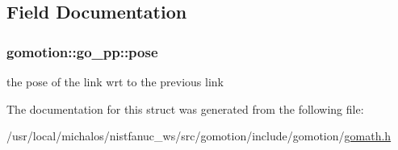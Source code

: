 \subsection{Field Documentation}
\hypertarget{structgomotion_1_1go__pp_a93d5d228709c062d8bcd465276e9f399}{
\subsubsection[{pose}]{ gomotion\-::go\-\_\-pp\-::pose}}\label{structgomotion_1_1go__pp_a93d5d228709c062d8bcd465276e9f399}
the pose of the link wrt to the previous link 

The documentation for this struct was generated from the following file\-:\begin{DoxyCompactItemize}
\item 
/usr/local/michalos/nistfanuc\-\_\-ws/src/gomotion/include/gomotion/\hyperlink{gomath_8h}{gomath.\-h}\end{DoxyCompactItemize}
